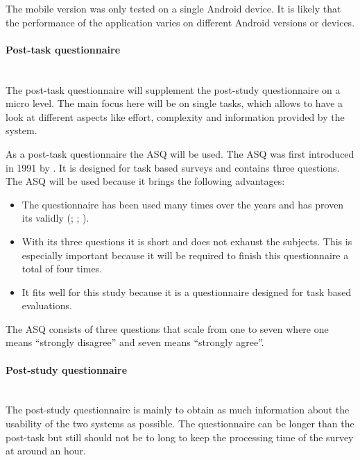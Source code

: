 The mobile version was only tested on a single Android device.
It is likely that the performance of the application varies on different Android versions or devices.

\paragraph{Post-task questionnaire}\mbox{}\\
The \gls{post-task} questionnaire will supplement the \gls{post-study} questionnaire on a micro level.
The main focus here will be on single tasks, which allows to have a look at different aspects like effort, complexity and information provided by the system. 

As a \gls{post-task} questionnaire the \gls{ASQ} will be used. 
The \gls{ASQ} was first introduced in 1991 by \cite{lewis1991psychometric}.
It is designed for task based surveys and contains three questions.
The \gls{ASQ} will be used because it brings the following advantages:
\begin{itemize}
  \item The questionnaire has been used many times over the years and has proven its validly (\cite{hajesmaeel2022most}; \cite{lewis1991psychometric}; \cite{lewis1995ibm}).
  \item With its three questions it is short and does not exhaust the subjects. This is especially important because it will be required to finish this questionnaire a total of four times.
  \item It fits well for this study because it is a questionnaire designed for task based evaluations.
\end{itemize}
The \gls{ASQ} consists of three questions that scale from one to seven where one means \enquote{strongly disagree} and seven means \enquote{strongly agree}.

\paragraph{Post-study questionnaire}\mbox{}\\
The \gls{post-study} questionnaire is mainly to obtain as much information about the \gls{usability} of the two systems as possible.
The questionnaire can be longer than the \gls{post-task} but still should not be to long to keep the processing time of the survey at around an hour.

